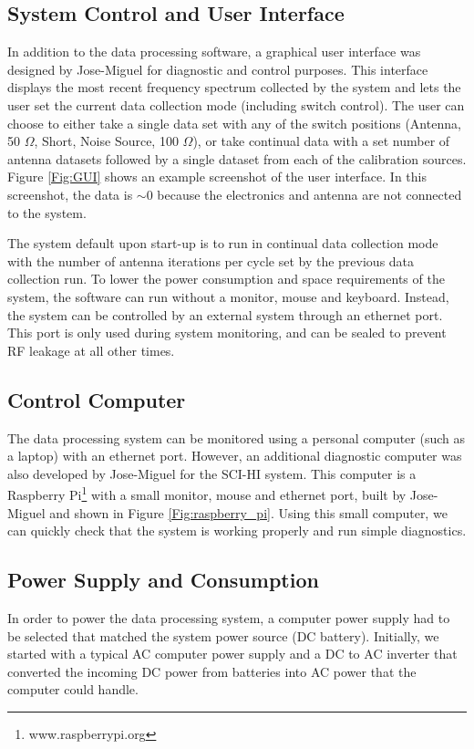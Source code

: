\subsection{System Control and User Interface}

In addition to the data processing software, a graphical user interface was designed by Jose-Miguel for diagnostic and control purposes. This interface displays the most recent frequency spectrum collected by the system and lets the user set the current data collection mode (including switch control). The user can choose to either take a single data set with any of the switch positions (Antenna, 50 $\Omega$, Short, Noise Source, 100 $\Omega$), or take continual data with a set number of antenna datasets followed by a single dataset from each of the calibration sources. Figure \ref{Fig:GUI} shows an example screenshot of the user interface. In this screenshot, the data is $\sim0$ because the electronics and antenna are not connected to the system. 

The system default upon start-up is to run in continual data collection mode with the number of antenna iterations per cycle set by the previous data collection run. To lower the power consumption and space requirements of the system, the software can run without a monitor, mouse and keyboard. Instead, the system can be controlled by an external system through an ethernet port. This port is only used during system monitoring, and can be sealed to prevent RF leakage at all other times. 


\subsection{Control Computer}

The data processing system can be monitored using a personal computer (such as a laptop) with an ethernet port. However, an additional diagnostic computer was also developed by Jose-Miguel for the SCI-HI system. This computer is a Raspberry Pi\footnote{www.raspberrypi.org} with a small monitor, mouse and ethernet port, built by Jose-Miguel and shown in Figure \ref{Fig:raspberry_pi}. Using this small computer, we can quickly check that the system is working properly and run simple diagnostics.

\subsection{Power Supply and Consumption}
In order to power the data processing system, a computer power supply had to be selected that matched the system power source (DC battery). Initially, we started with a typical AC computer power supply and a DC to AC inverter that converted the incoming DC power from batteries into AC power that the computer could handle. 

